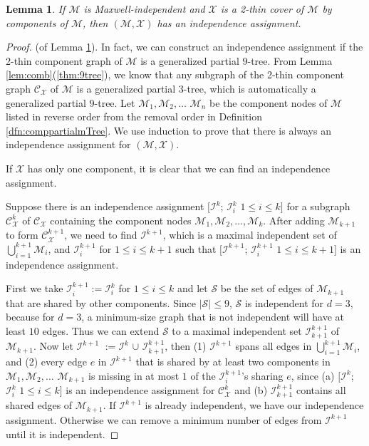 \documentclass[10pt]{article}
\def\S{\mathcal {S}}
\def\M{\mathcal {M}}
\def\I{\mathcal {I}}
\def\X{\mathcal {X}}
\def\C{\mathscr{C}}
\newtheorem{lem}{Lemma}
\begin{document}
\begin{lem}\label{lem:assign}
If $\M$ is Maxwell-independent and $\X$ is a 2-thin cover of $\M$ by components of $\M$, then $(\M, \X)$ has an independence assignment.
\end{lem}
\begin{proof} (of Lemma \ref{lem:assign}).
In fact, we can construct an independence assignment if the 2-thin component graph of $\M$ is a generalized partial $9$-tree.
From Lemma \ref{lem:comb}(\ref{thm:9tree}), we know that any subgraph of the 2-thin component graph $\C_{\X}$ of $\M$ is a generalized partial
$3$-tree, which is automatically a generalized partial $9$-tree. Let $\M_1, \M_2, \ldots$ $\M_n$ be the component nodes of $\M$ listed in reverse order from the removal order in Definition \ref{dfn:comppartialmTree}. We use induction to prove that there is always an independence assignment for $(\M, \X)$.

If $\X$ has only one component, it is clear that we can find an independence assignment.

Suppose there is an independence assignment $[\I^{k}$; $\I^{k}_i$ $1\leq i\leq k]$ for a subgraph $\C_{\X}^k$ of $\C_{\X}$ containing the component nodes $\M_1, \M_2, \ldots, \M_k$. After adding $\M_{k+1}$ to form $\C_{\X}^{k+1}$, we need to find $\I^{k+1}$, which is a maximal independent set of $\bigcup\limits_{i=1}^{k+1}\M_i$, and $\I^{k+1}_i$ for $1\le i\le k+1$ such that $[\I^{k+1}$; $\I^{k+1}_i$ $1\leq i\leq k+1]$ is an independence assignment.

First we take $\I^{k+1}_i := \I^{k}_i$ for $1 \leq i \leq k$ and let $\S$ be the set of edges of $\M_{k+1}$ that are shared by other components. Since $|\S| \leq 9$, $\S$ is independent for $d=3$, because for $d=3$, a minimum-size graph that is not independent will have at least $10$ edges. Thus we can extend $\S$ to a maximal independent set $\I^{k+1}_{k+1}$ of $\M_{k+1}$. Now let $\I^{k+1}$ $:=\I^{k}$ $\cup$ $\I^{k+1}_{k+1}$, then (1) $\I^{k+1}$ spans all edges in $\bigcup\limits_{i=1}^{k+1}\M_i$, and (2) every edge $e$ in $\I^{k+1}$ that is shared by at least two components in $\M_1, \M_2, \ldots$ $\M_{k+1}$ is missing in at most $1$ of the $\I^{k+1}_i$'s sharing $e$, since (a) $[\I^{k}$; $\I^{k}_i$ $1\leq i\leq k]$ is an independence assignment for $\C_{\X}^k$ and (b) $\I^{k+1}_{k+1}$ contains all shared edges of $\M_{k+1}$. If $\I^{k+1}$ is already independent, we have our independence assignment. Otherwise we can remove a minimum number of edges from $\I^{k+1}$ until it is independent.

\end{proof}
\end{document}
